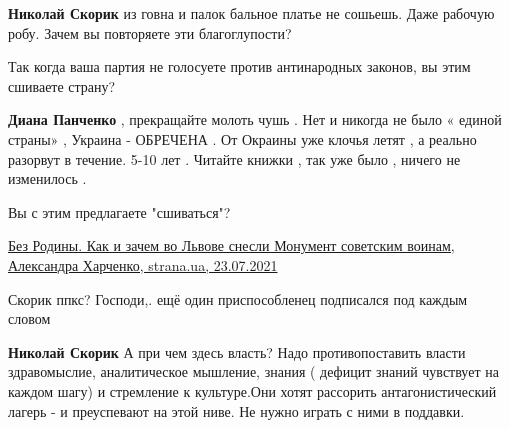\begin{itemize}
\begin{itemize}
\textbf{Николай Скорик} из говна и палок бальное платье не сошьешь. Даже рабочую робу. Зачем вы повторяете эти благоглупости?

 
Так когда ваша партия не голосуете против антинародных законов, вы этим сшиваете страну?

 
\textbf{Диана Панченко} , прекращайте молоть чушь . Нет и никогда не было «
единой страны» , Украина - ОБРЕЧЕНА . От Окраины уже клочья летят , а реально
разорвут в течение. 5-10 лет . Читайте книжки , так уже было , ничего не
изменилось .

 
Вы с этим предлагаете "сшиваться"?

\href{https://strana.ua/news/345337-vo-lvove-okonchatelno-snesli-monument-slavy-.html}{%
Без Родины. Как и зачем во Львове снесли Монумент советским воинам, Александра Харченко, %
strana.ua, 23.07.2021%
}

 
Скорик ппкс? Господи,. ещё один приспособленец подписался под каждым словом \Laughey[1.0][white]

 
\textbf{Николай Скорик} А при чем здесь власть? Надо противопоставить власти
здравомыслие, аналитическое мышление, знания ( дефицит знаний чувствует на
каждом шагу) и стремление к культуре.Они хотят рассорить антагонистический
лагерь - и преуспевают на этой ниве. Не нужно играть с ними в поддавки.


\end{itemize}
\end{itemize}
